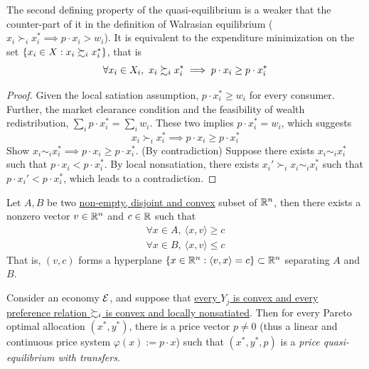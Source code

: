 \documentclass{report}
\begin{document}
		\begin{proposition}
			The second defining property of the quasi-equilibrium is a weaker that the counter-part of it in the definition of Walrasian equilibrium ($x_i \succ_i x_i^* \implies p \cdot x_i > w_i$). It is equivalent to the expenditure minimization on the set $\{x_i \in X: x_i \succsim_i x_i^*\}$, that is
			\begin{equation}
				\forall x_i \in X_i,\ x_i \succsim_i x_i^* \implies p \cdot x_i \geq p \cdot x_i^*
			\end{equation}
			\begin{proof}
				Given the local satiation assumption, $p \cdot x_i^* \geq w_i$ for every consumer. Further, the market clearance condition and the feasibility of wealth redistribution, $\sum_i p \cdot x_i^* = \sum_i w_i$. These two implies $p \cdot x_i^* = w_i$, which suggests 
				\begin{equation}
					x_i \succ_i x_i^* \implies p \cdot x_i \geq p \cdot x_i^*
				\end{equation}
				Show $x_i \sim_i x_i^* \implies p \cdot x_i \geq p \cdot x_i^*$. (By contradiction) Suppose there exists $x_i \sim_i x_i^*$ such that $p \cdot x_i < p \cdot x_i^*$. By local nonsatiation, there exists $x_i' \succ_i x_i \sim_i x_i^*$ such that $p \cdot x_i' < p \cdot x_i^*$, which leads to a contradiction.
			\end{proof}
		\end{proposition}
		
		\begin{theorem}
			Let $A, B$ be two \ul{non-empty, disjoint and convex} subset of $\mathbb{R}^n$, then there exists a nonzero vector $v \in \mathbb{R}^n$ and $c \in \mathbb{R}$ such that 
			\begin{align}
				\forall x \in A,\ \langle x, v \rangle \geq c \\
				\forall x \in B,\ \langle x, v \rangle \leq c
			\end{align}
			That is, $(v, c)$ forms a hyperplane $\{x \in \mathbb{R}^n: \langle v, x \rangle = c\} \subset \mathbb{R}^n$ separating $A$ and $B$.
		\end{theorem}
		
		\begin{proposition}
			Consider an economy $\mathcal{{E}}$, and suppose that \ul{every $Y_j$ is convex and every preference relation $\succsim_i$ is convex and locally nonsatiated}. Then for every Pareto optimal allocation $(x^*, y^*)$, there is a price vector $p \neq 0$ (thus a linear and continuous price system $\varphi(x) := p \cdot x$) such that $(x^*, y^*, p)$ is a \emph{price quasi-equilibrium with transfers}.
		\end{proposition}
		
\end{document}
